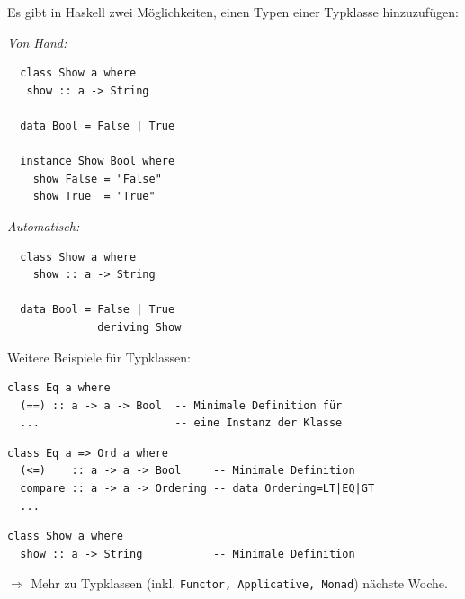 \documentclass[unknownkeysallowed]{beamer}
\begin{document}
  
  \begin{frame}[fragile]
  
  Es gibt in Haskell zwei Möglichkeiten, einen Typen einer Typklasse hinzuzufügen:\pause  
  
  \begin{multicols}{2}
  \emph{Von Hand:}
  
  \begin{verbatim}
  class Show a where
   show :: a -> String
  
  data Bool = False | True

  instance Show Bool where
    show False = "False"
    show True  = "True"
  \end{verbatim}
  
  \pause
  \columnbreak  
  \emph{Automatisch:}
  
  \begin{verbatim}
  class Show a where
    show :: a -> String  
  
  data Bool = False | True 
              deriving Show
  \end{verbatim}
  \end{multicols} 
  
\end{frame}


  \begin{frame}[fragile]
  
  Weitere Beispiele für Typklassen: \pause

  \begin{verbatim}
class Eq a where
  (==) :: a -> a -> Bool  -- Minimale Definition für
  ...                     -- eine Instanz der Klasse
  \end{verbatim}
  
  \pause
  
  \begin{verbatim}
class Eq a => Ord a where
  (<=)    :: a -> a -> Bool     -- Minimale Definition
  compare :: a -> a -> Ordering -- data Ordering=LT|EQ|GT
  ...
  \end{verbatim}
  
  \pause
  
  \begin{verbatim}
class Show a where
  show :: a -> String           -- Minimale Definition
  \end{verbatim}
  
  \pause
  
  $\Rightarrow$ Mehr zu Typklassen (inkl. \texttt{Functor, Applicative, Monad}) 
  nächste Woche.

\end{frame}
\end{document}
